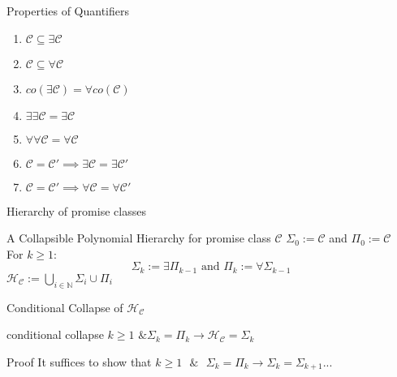         \begin{frame}{Properties of Quantifiers}
            \begin{enumerate}
                \item $\mathcal{C} \subseteq \exists{\mathcal{C}}$
                \item $\mathcal{C} \subseteq \forall{\mathcal{C}}$
                \pause
                \item $co(\exists \mathcal{C}) = \forall co(\mathcal{C})$
                \pause
                \item $\exists \exists \mathcal{C} = \exists{\mathcal{C}}$
                \item $\forall \forall \mathcal{C} = \forall{\mathcal{C}}$
                \pause
                \item $\mathcal{C} = \mathcal{C}' \implies \exists{\mathcal{C}} = \exists{\mathcal{C}}'$
                \item $\mathcal{C} = \mathcal{C}' \implies \forall{\mathcal{C}} = \forall{\mathcal{C}}'$
            \end{enumerate}
        \end{frame}
        \begin{frame}{Hierarchy of promise classes}
            \begin{block}{A Collapsible Polynomial Hierarchy for promise class $\mathcal{C}$}
                $\Sigma_0 :=  \mathcal{C}$ and
                $\Pi_0 :=  \mathcal{C}$\\
                For $k \geq 1 $:
                    $$\Sigma_k := \exists\Pi_{k-1} \text{ and }
                    \Pi_k := \forall\Sigma_{k-1}$$
                $\mathcal{H}_{\mathcal{C}} := \bigcup\limits_{i \in \mathbb{N}} \Sigma_i \cup \Pi_i$
                
            \end{block}
        \end{frame}

        
        \begin{frame}{Conditional Collapse of $\mathcal{H}_{\mathcal{C}}$}
            \begin{lemma}{conditional collapse}
                $k \geq 1 \text{ \& } \Sigma_k = \Pi_k \to \mathcal{H}_{\mathcal{C}} = \Sigma_k$
            \end{lemma}
            \pause
            \begin{block}{Proof}
                It suffices to show that 
                $k \geq 1 \text{ $\&$ } \Sigma_k = \Pi_k 
                \to \Sigma_k = \Sigma_{k+1}$...
            \end{block}
        \end{frame}

